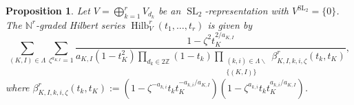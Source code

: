 \documentclass{amsart}
\newtheorem{proposition}[theorem]{Proposition}
\theoremstyle{definition}
\theoremstyle{remark}
\newcommand{\Z}{\mathbb{Z}}
\newcommand{\N}{\mathbb{N}}
\newcommand{\SL}{\operatorname{SL}}
\newcommand{\Hilb}{\operatorname{Hilb}}
\begin{document}
\begin{proposition}
\label{prop:MultivarHilbSer}
Let $V = \bigoplus_{k=1}^r V_{d_k}$ be an $\SL_2$-representation with $V^{\SL_2} = \{0\}$.
The $\N^r$-graded Hilbert series $\Hilb_V^r(t_1,\ldots,t_r)$ is given by
\begin{equation}
\label{eq:MultivarHilbSer}
    \sum\limits_{(K,I)\in\Lambda} \sum\limits_{\zeta^{a_{K,I}} = 1}
    \frac{ 1 - \zeta^2 t_K^{2/a_{K,I}}}
    {a_{K,I}(1 - t_K^2)
    \prod\limits_{d_k\in 2\Z}(1 - t_k)
        \prod\limits_{\substack{(k,i)\in\Lambda \smallsetminus \\ \{(K,I)\}}}
            \beta_{K,I,k,i,\zeta}^r(t_k, t_K)},
\end{equation}
where
$\beta_{K,I,k,i,\zeta}^r(t_k, t_K) := (1 - \zeta^{-a_{k,i}} t_k t_K^{-a_{k,i}/a_{K,I}})
(1 - \zeta^{a_{k,i}} t_k t_K^{a_{k,i}/a_{K,I}})$.
\end{proposition}
\end{document}
